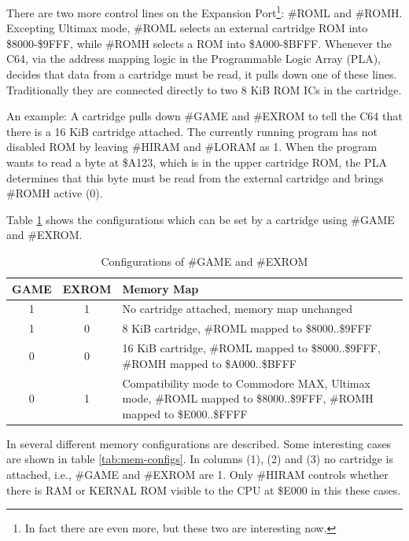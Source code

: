 \documentclass[a4paper,oneside]{memoir}
\begin{document}
There are two more control lines on the Expansion 
Port\footnote{In fact there are even more, but these two are interesting now.}:
\#ROML and \#ROMH. Excepting Ultimax mode, \#ROML selects an external
cartridge ROM into \$8000-\$9FFF, while \#ROMH selects a ROM into
\$A000-\$BFFF. Whenever the C64, via the address mapping logic in
the Programmable Logic Array (PLA), decides that data from a
cartridge must be read, it pulls down one of these lines.
Traditionally they are connected directly to two 8 KiB ROM ICs in
the cartridge.

An example: A cartridge pulls down \#GAME and \#EXROM to tell the C64
that there is a 16 KiB cartridge attached. The currently running
program has not disabled ROM by leaving \#HIRAM and \#LORAM as 1. When
the program wants to read a byte at \$A123, which is in the upper
cartridge ROM, the PLA determines that this byte must be read from
the external cartridge and brings \#ROMH active (0).

Table \ref {tab:game-exrom} shows the configurations which can be set by a cartridge using \#GAME and \#EXROM.

\begin{table}
    \centering
    \begin{tabularx}{\textwidth}{ccX}
        \toprule
        GAME & EXROM & Memory Map \\
        \midrule
        1 & 1 & No cartridge attached, memory map unchanged \\[3pt]
        1 & 0 & 8 KiB cartridge, \#ROML mapped to \$8000..\$9FFF \\[3pt]
        0 & 0 & 16 KiB cartridge, \#ROML mapped to \$8000..\$9FFF, \#ROMH mapped to \$A000..\$BFFF \\[3pt]
        0 & 1 & Compatibility mode to Commodore MAX, Ultimax mode,
                \#ROML mapped to \$8000..\$9FFF, \#ROMH mapped to \$E000..\$FFFF \\[3pt]
        \bottomrule
    \end{tabularx}
    \caption{Configurations of \#GAME and \#EXROM}
    \label{tab:game-exrom}
\end{table}

In \cite[Appendix~A]{PLA12} several different memory configurations are described.
Some interesting cases are shown in table \ref {tab:mem-configs}.
In columns (1), (2) and (3) no cartridge is attached, i.e., \#GAME and \#EXROM are 1.
Only \#HIRAM controls whether there is RAM or KERNAL ROM visible to the CPU at \$E000 in this these cases.
\end{document}
